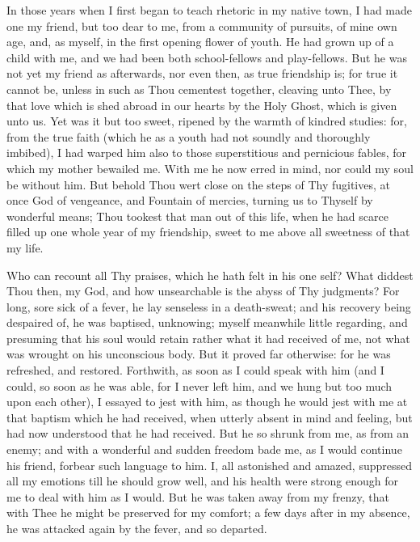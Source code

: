 \documentclass[b5paper,openright,12pt,twoside]{book}
\begin{document}
In those years when I first began to teach rhetoric in my native town,
I had made one my friend, but too dear to me, from a community of
pursuits, of mine own age, and, as myself, in the first opening flower
of youth. He had grown up of a child with me, and we had been both
school-fellows and play-fellows. But he was not yet my friend as
afterwards, nor even then, as true friendship is; for true it cannot be,
unless in such as Thou cementest together, cleaving unto Thee, by that
love which is shed abroad in our hearts by the Holy Ghost, which is
given unto us. Yet was it but too sweet, ripened by the warmth of
kindred studies: for, from the true faith (which he as a youth had
not soundly and thoroughly imbibed), I had warped him also to those
superstitious and pernicious fables, for which my mother bewailed me.
With me he now erred in mind, nor could my soul be without him. But
behold Thou wert close on the steps of Thy fugitives, at once God of
vengeance, and Fountain of mercies, turning us to Thyself by wonderful
means; Thou tookest that man out of this life, when he had scarce filled
up one whole year of my friendship, sweet to me above all sweetness of
that my life.

Who can recount all Thy praises, which he hath felt in his one self?
What diddest Thou then, my God, and how unsearchable is the abyss of
Thy judgments? For long, sore sick of a fever, he lay senseless in
a death-sweat; and his recovery being despaired of, he was baptised,
unknowing; myself meanwhile little regarding, and presuming that his
soul would retain rather what it had received of me, not what was
wrought on his unconscious body. But it proved far otherwise: for he was
refreshed, and restored. Forthwith, as soon as I could speak with him
(and I could, so soon as he was able, for I never left him, and we hung
but too much upon each other), I essayed to jest with him, as though he
would jest with me at that baptism which he had received, when utterly
absent in mind and feeling, but had now understood that he had received.
But he so shrunk from me, as from an enemy; and with a wonderful and
sudden freedom bade me, as I would continue his friend, forbear such
language to him. I, all astonished and amazed, suppressed all my
emotions till he should grow well, and his health were strong enough for
me to deal with him as I would. But he was taken away from my frenzy,
that with Thee he might be preserved for my comfort; a few days after in
my absence, he was attacked again by the fever, and so departed.
\end{document}

